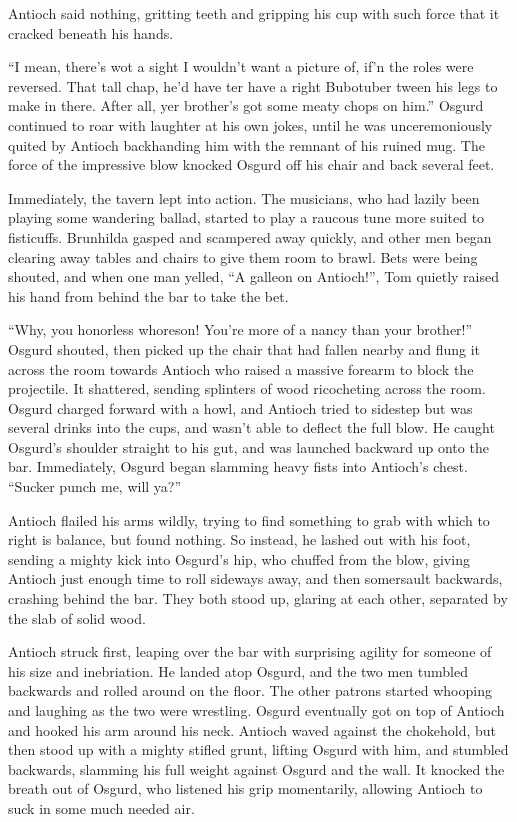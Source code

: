 Antioch said nothing, gritting teeth and gripping his cup with such force that it cracked beneath his hands.

“I mean, there’s wot a sight I wouldn’t want a picture of, if’n the roles were reversed. That tall chap, he’d have ter have a right Bubotuber tween his legs to make in there. After all, yer brother’s got some meaty chops on him.” Osgurd continued to roar with laughter at his own jokes, until he was unceremoniously quited by Antioch backhanding him with the remnant of his ruined mug. The force of the impressive blow knocked Osgurd off his chair and back several feet.

Immediately, the tavern lept into action. The musicians, who had lazily been playing some wandering ballad, started to play a raucous tune more suited to fisticuffs. Brunhilda gasped and scampered away quickly, and other men began clearing away tables and chairs to give them room to brawl. Bets were being shouted, and when one man yelled, “A galleon on Antioch!”, Tom quietly raised his hand from behind the bar to take the bet.

“Why, you honorless whoreson! You’re more of a nancy than your brother!” Osgurd shouted, then picked up the chair that had fallen nearby and flung it across the room towards Antioch who raised a massive forearm to block the projectile. It shattered, sending splinters of wood ricocheting across the room. Osgurd charged forward with a howl, and Antioch tried to sidestep but was several drinks into the cups, and wasn’t able to deflect the full blow. He caught Osgurd’s shoulder straight to his gut, and was launched backward up onto the bar. Immediately, Osgurd began slamming heavy fists into Antioch’s chest. “Sucker punch me, will ya?”

Antioch flailed his arms wildly, trying to find something to grab with which to right is balance, but found nothing. So instead, he lashed out with his foot, sending a mighty kick into Osgurd’s hip, who chuffed from the blow, giving Antioch just enough time to roll sideways away, and then somersault backwards, crashing behind the bar. They both stood up, glaring at each other, separated by the slab of solid wood.

Antioch struck first, leaping over the bar with surprising agility for someone of his size and inebriation. He landed atop Osgurd, and the two men tumbled backwards and rolled around on the floor. The other patrons started whooping and laughing as the two were wrestling. Osgurd eventually got on top of Antioch and hooked his arm around his neck. Antioch waved against the chokehold, but then stood up with a mighty stifled grunt, lifting Osgurd with him, and stumbled backwards, slamming his full weight against Osgurd and the wall. It knocked the breath out of Osgurd, who listened his grip momentarily, allowing Antioch to suck in some much needed air.

